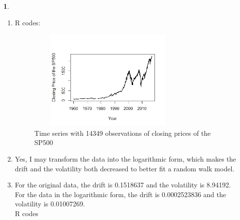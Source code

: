 \documentclass[10pt]{article}
\newtheorem{prob}{\bm{$Problem$}}
\begin{document}
\begin{prob}
\end{prob}
\begin{enumerate}[1)]
\vspace{3mm}

\item
R codes:
\begin{figure}[H]
  \centering
  \includegraphics[width=8cm,height=5cm]{p41a.jpeg}
  \caption{Time series with 14349 observations of closing prices of the SP500}
\end{figure}
\vspace{3mm}

\item
Yes, I may transform the data into the logarithmic form, which makes the drift and the volatility both decreased to better fit a random walk model.
\vspace{3mm}

\item
For the original data, the drift is 0.1518637 and the volatility is 8.94192.\\
For the data in the logarithmic form, the drift is 0.0002523836 and the volatility is 0.01007269.\\
R codes

\vspace{3mm}


\end{enumerate}
\end{document}
